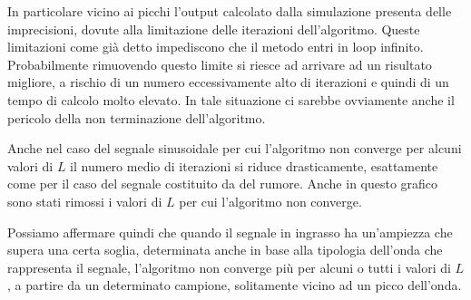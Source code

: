 		In particolare vicino ai picchi l'output calcolato dalla simulazione presenta delle imprecisioni, dovute alla limitazione delle iterazioni dell'algoritmo. Queste limitazioni come già detto impediscono che il metodo entri in loop infinito. Probabilmente rimuovendo questo limite si riesce ad arrivare ad un risultato migliore, a rischio di un numero eccessivamente alto di iterazioni e quindi di un tempo di calcolo molto elevato. In tale situazione ci sarebbe ovviamente anche il pericolo della non terminazione dell'algoritmo.
	
		Anche nel caso del segnale sinusoidale per cui l'algoritmo non converge per alcuni valori di $L$ il numero medio di iterazioni si riduce drasticamente, esattamente come per il caso del segnale costituito da del rumore. Anche in questo grafico sono stati rimossi i valori di $L$ per cui l'algoritmo non converge.
	
	
		Possiamo affermare quindi che quando il segnale in ingrasso ha un'ampiezza che supera una certa soglia, determinata anche in base alla tipologia dell'onda che rappresenta il segnale, l'algoritmo non converge più per alcuni o tutti i valori di $L$, a partire da un determinato campione, solitamente vicino ad un picco dell'onda.
